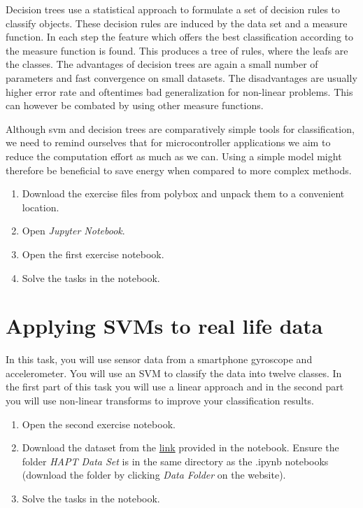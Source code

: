 \documentclass[parskip=half,notes,cadrem,toolver]{iisvlsi}
\begin{document}
Decision trees use a statistical approach to formulate a set of decision rules to classify objects. These decision rules are induced by the data set and a measure function. In each step the feature which offers the best classification according to the measure function is found. This produces a tree of rules, where the leafs are the classes.
The advantages of decision trees are again a small number of parameters and fast convergence on small datasets. The disadvantages are usually higher error rate and oftentimes bad generalization for non-linear problems. This can however be combated by using other measure functions.

Although \gls{svm} and decision trees are comparatively simple tools for classification, we need to remind ourselves that for microcontroller applications we aim to reduce the computation effort as much as we can. Using a simple model might therefore be beneficial to save energy when compared to more complex methods. 


\begin{studtask}
    \begin{enumerate}
        \item Download the exercise files from polybox and unpack them to a convenient location.
        \item Open \textit{Jupyter Notebook}.
        \item Open the first exercise notebook. 
        \item Solve the tasks in the notebook.
    \end{enumerate}
\end{studtask}

\section{Applying SVMs to real life data}

In this task, you will use sensor data from a smartphone gyroscope and accelerometer. You will use an SVM to classify the data into twelve classes. In the first part of this task you will use a linear approach and in the second part you will use non-linear transforms to improve your classification results.

\begin{studtask}
    \begin{enumerate}
        \item Open the second exercise notebook. 
        \item Download the dataset from the \href{https://archive.ics.uci.edu/dataset/341/smartphone+based+recognition+of+human+activities+and+postural+transitions}{link} provided in the notebook. Ensure the folder \textit{HAPT Data Set} is in the same directory as the .ipynb notebooks (download the folder by clicking \textit{Data Folder} on the website).
        \item Solve the tasks in the notebook.
    \end{enumerate}
\end{studtask}
\end{document}
